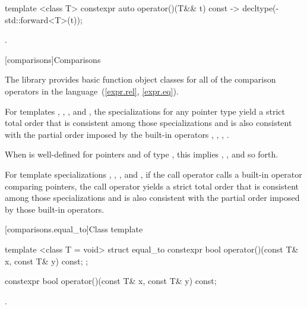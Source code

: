 %
\begin{itemdecl}
template <class T> constexpr auto operator()(T&& t) const
    -> decltype(-std::forward<T>(t));
\end{itemdecl}

\begin{itemdescr}
\pnum\returns {}.
\end{itemdescr}


[comparisons]{Comparisons}

\pnum
The library provides basic function object classes for all of the comparison
operators in the language~(\ref{expr.rel}, \ref{expr.eq}).

\pnum
For templates , , , and
, the specializations for any pointer type
yield a strict total order that is consistent among those specializations and
is also consistent with the partial order imposed by
the built-in operators \tcode{<}, \tcode{>}, \tcode{<=}, \tcode{>=}.
\begin{note} When  is well-defined
for pointers  and  of type ,
this implies ,
, and so forth. \end{note}
For template specializations , ,
, and ,
if the call operator calls a built-in operator comparing pointers,
the call operator yields a strict total order
that is consistent among those specializations and
is also consistent with the partial order imposed by those built-in operators.

[comparisons.equal_to]{Class template }

%
\begin{itemdecl}
template <class T = void> struct equal_to {
  constexpr bool operator()(const T& x, const T& y) const;
};
\end{itemdecl}

%
\begin{itemdecl}
constexpr bool operator()(const T& x, const T& y) const;
\end{itemdecl}

\begin{itemdescr}
\pnum\returns {}.
\end{itemdescr}

